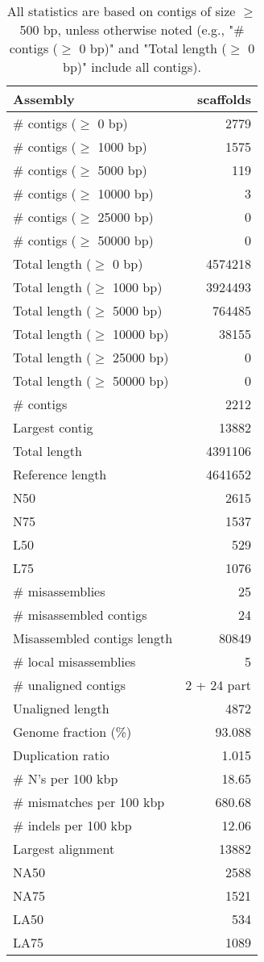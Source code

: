 \documentclass[12pt,a4paper]{article}
\begin{document}
\begin{table}[ht]
\begin{center}
\caption{All statistics are based on contigs of size $\geq$ 500 bp, unless otherwise noted (e.g., "\# contigs ($\geq$ 0 bp)" and "Total length ($\geq$ 0 bp)" include all contigs).}
\begin{tabular}{|l*{1}{|r}|}
\hline
Assembly & scaffolds \\ \hline
\# contigs ($\geq$ 0 bp) & 2779 \\ \hline
\# contigs ($\geq$ 1000 bp) & 1575 \\ \hline
\# contigs ($\geq$ 5000 bp) & 119 \\ \hline
\# contigs ($\geq$ 10000 bp) & 3 \\ \hline
\# contigs ($\geq$ 25000 bp) & 0 \\ \hline
\# contigs ($\geq$ 50000 bp) & 0 \\ \hline
Total length ($\geq$ 0 bp) & 4574218 \\ \hline
Total length ($\geq$ 1000 bp) & 3924493 \\ \hline
Total length ($\geq$ 5000 bp) & 764485 \\ \hline
Total length ($\geq$ 10000 bp) & 38155 \\ \hline
Total length ($\geq$ 25000 bp) & 0 \\ \hline
Total length ($\geq$ 50000 bp) & 0 \\ \hline
\# contigs & 2212 \\ \hline
Largest contig & 13882 \\ \hline
Total length & 4391106 \\ \hline
Reference length & 4641652 \\ \hline
N50 & 2615 \\ \hline
N75 & 1537 \\ \hline
L50 & 529 \\ \hline
L75 & 1076 \\ \hline
\# misassemblies & 25 \\ \hline
\# misassembled contigs & 24 \\ \hline
Misassembled contigs length & 80849 \\ \hline
\# local misassemblies & 5 \\ \hline
\# unaligned contigs & 2 + 24 part \\ \hline
Unaligned length & 4872 \\ \hline
Genome fraction (\%) & 93.088 \\ \hline
Duplication ratio & 1.015 \\ \hline
\# N's per 100 kbp & 18.65 \\ \hline
\# mismatches per 100 kbp & 680.68 \\ \hline
\# indels per 100 kbp & 12.06 \\ \hline
Largest alignment & 13882 \\ \hline
NA50 & 2588 \\ \hline
NA75 & 1521 \\ \hline
LA50 & 534 \\ \hline
LA75 & 1089 \\ \hline
\end{tabular}
\end{center}
\end{table}
\end{document}
